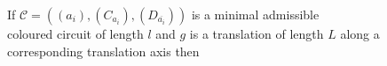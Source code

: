 \documentclass[preview]{standalone}
\begin{document}
\begin{justify}
{\parbox{8cm}{If $\mathcal{C} = ((a_i), (C_{a_i}), (D_{\overline{a_i}}))$ is a minimal admissible \\ coloured circuit of length $l$ and $g$ is a translation of length $L$ along a corresponding translation axis then}}
\end{justify}
\end{document}
